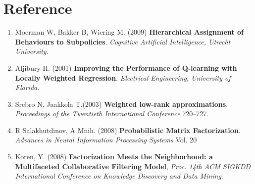 \documentclass[11pt]{article}
\theoremstyle{definition}
\begin{document}
\section*{\textbf{Reference}}
\begin{enumerate}
\item \label{ref:handbook}
Moerman W, Bakker B, Wiering M. (2009) \textbf{Hierarchical Assignment of Behaviours to Subpolicies}. \textit{Cognitive Artificial Intelligence, Utrecht University}. 
\item \label{ref:MFieee}
Aljibury H. (2001) \textbf{Improving the Performance of Q-learning with Locally Weighted Regression}. \textit{Electrical Engineering, University of Florida}. 
\item \label{ref:WLA}
Srebro N,  Jaakkola T.(2003) \textbf{Weighted low-rank approximations}. \textit{Proceedings of the Twentieth International Conference} 720–727.
\item \label{ref:PMF}
R Salakhutdinov, A Mnih. (2008) \textbf{Probabilistic Matrix Factorization}. \textit{Advances in Neural Information Processing Systems} Vol. 20

\item \label{ref:implicit}
Koren, Y. (2008) \textbf{Factorization Meets the Neighborhood: a Multifaceted Collaborative Filtering Model}, \textit{Proc. 14th ACM SIGKDD International Conference on Knowledge Discovery and
Data Mining}.

\end{enumerate}
\end{document}
